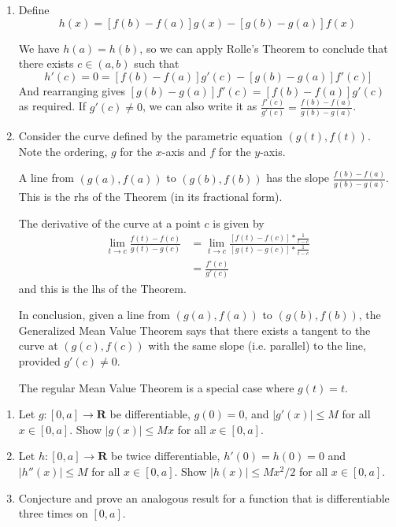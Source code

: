\documentclass{oxmathproblems}
\begin{document}
\begin{questions}
\begin{solution}
  \begin{enumerate}[label=(\alph*)]
    \item Define 
    \[h(x)=[f(b)-f(a)]g(x) - [g(b)-g(a)]f(x)\]

    We have $h(a)=h(b)$, so we can apply Rolle's Theorem to conclude that there exists $c \in (a, b)$ such that
    \[h'(c)=0=[f(b)-f(a)]g'(c) - [g(b)-g(a)]f'(c)]\]
    And rearranging gives $[g(b)-g(a)]f'(c)=[f(b)-f(a)]g'(c)$ as required. If $g'(c) \neq 0$, we can also write it as
    $\frac{f'(c)}{g'(c)}=\frac{f(b)-f(a)}{g(b)-g(a)}$.

    \item Consider the curve defined by the parametric equation $(g(t), f(t))$. Note the ordering, $g$ for the $x$-axis and $f$ for the $y$-axis.
    
    A line from $(g(a), f(a))$ to $(g(b), f(b))$ has the slope $\frac{f(b)-f(a)}{g(b)-g(a)}$. This is the rhs of the Theorem (in its fractional form).

    The derivative of the curve at a point $c$ is given by
    \begin{align*}
      \lim_{t \to c}\frac{f(t)-f(c)}{g(t)-g(c)} &= \lim_{t \to c}\frac{[f(t)-f(c)] * \frac{1}{t-c}}{[g(t)-g(c)] * \frac{1}{t-c}}\\
      &= \frac{f'(c)}{g'(c)}
    \end{align*}
    and this is the lhs of the Theorem.

    In conclusion, given a line from $(g(a), f(a))$ to $(g(b), f(b))$, the Generalized Mean Value Theorem says that there exists a tangent to the curve
    at $(g(c), f(c))$ with the same slope (i.e. parallel) to the line, provided $g'(c) \neq 0$.

    The regular Mean Value Theorem is a special case where $g(t)=t$.
  \end{enumerate}
\end{solution}

\miquestion
\begin{enumerate}[label=(\alph*)]
  \item Let $g: [0, a] \to \textbf{R}$ be differentiable, $g(0)=0$, and $|g'(x)| \leq M$ for all $x \in [0, a]$. Show $|g(x)| \leq Mx$ for all $x \in [0, a]$.
  \item Let $h: [0, a] \to \textbf{R}$ be twice differentiable, $h'(0)=h(0)=0$ and $|h''(x)| \leq M$ for all $x \in [0, a]$. Show $|h(x)| \leq Mx^{2}/2$ for all
  $x \in [0, a]$.
  \item Conjecture and prove an analogous result for a function that is differentiable three times on $[0, a]$.
\end{enumerate}


\end{questions}
\end{document}
